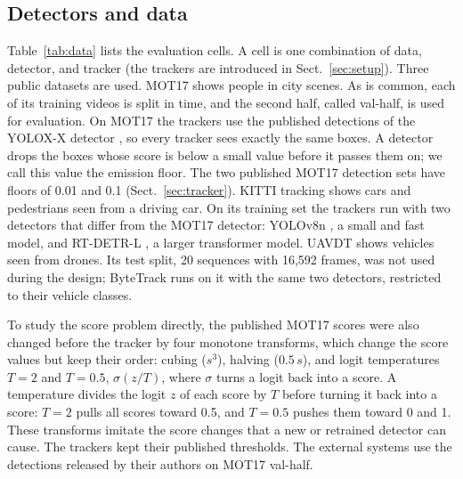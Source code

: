 \documentclass[pdflatex,sn-mathphys-num,iicol]{sn-jnl}
\begin{document}
\subsection{Detectors and data}\label{sec:data}
Table~\ref{tab:data} lists the evaluation cells. A cell is one combination of
data, detector, and tracker (the trackers are introduced in
Sect.~\ref{sec:setup}). Three public datasets are used. MOT17
\cite{milan2016mot16} shows people in city scenes. As is common, each of its
training videos is split in time, and the second half, called val-half, is
used for evaluation. On MOT17 the trackers use the published detections of
the YOLOX-X detector \cite{ge2021yolox}, so every tracker sees exactly the
same boxes. A detector drops the boxes whose score is below a small value
before it passes them on; we call this value the emission floor. The two
published MOT17 detection sets have floors of 0.01 and 0.1
(Sect.~\ref{sec:tracker}). KITTI tracking \cite{geiger2012kitti} shows cars
and pedestrians seen from a driving car. On its training set the trackers run
with two detectors that differ from the MOT17 detector: YOLOv8n
\cite{jocher2023yolov8}, a small and fast model, and RT-DETR-L
\cite{zhao2024rtdetr}, a larger transformer model. UAVDT \cite{du2018uavdt}
shows vehicles seen from drones. Its test split, 20 sequences with 16,592
frames, was not used during the design; ByteTrack runs on it with the same two
detectors, restricted to their vehicle classes.

To study the score problem directly, the published MOT17 scores were also
changed before the tracker by four monotone transforms, which change the
score values but keep their order: cubing ($s^3$), halving ($0.5\,s$), and
logit temperatures $T=2$ and $T=0.5$, $\sigma(z/T)$, where $\sigma$ turns a
logit back into a score. A temperature divides the logit $z$ of each score by
$T$ before turning it back into a score: $T=2$ pulls all scores toward 0.5,
and $T=0.5$ pushes them toward 0 and 1. These transforms imitate the score
changes that a new or retrained detector can cause. The trackers kept their
published thresholds. The external systems use the detections released by
their authors on MOT17 val-half.
\end{document}
